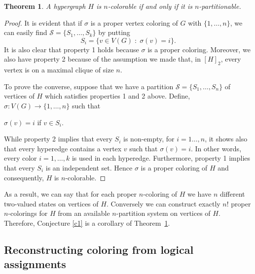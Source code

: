 \documentclass[%
12pt,
prereprint,
showpacs,
showkeys,
preprintnumbers,
amsmath,amssymb,
aps,
pra,
longbibliography,
notitlepage
]{revtex4-1}
\newtheorem{theorem}{{\color{THM} Theorem}}%
\theoremstyle{definition}
\begin{document}
        \begin{theorem}\label{separable}
                A hypergraph $H$ is $n$-colorable if and only if it is $n$-partitionable.
        \end{theorem}
        \begin{proof}
                It is evident that if $\sigma$ is a proper vertex coloring of $G$ with $\{1,\ldots , n\}$, we can easily find $\mathcal{S}=\{S_1 , \ldots , S_k \}$ by putting $$S_i =\{v\in V(G)\; : \; \sigma(v)=i \}.$$ It is also clear that property 1 holds because $\sigma$ is a proper coloring. Moreover, we also have property 2 because of the assumption we made that, in $[H]_2$, every vertex is on a maximal clique of size $n$.

                To prove the converse, suppose that we have a partition $\mathcal{S}=\{S_1 , \ldots , S_n \}$ of vertices of $H$ which satisfies properties 1 and 2 above. Define, $\sigma: V(G) \longrightarrow \{1,\ldots , n\}$ such that

                \begin{center}
                        $\sigma(v)=i$ if $v\in S_i.$
                \end{center}

                While property 2 implies that every $S_i$ is non-empty, for $i=1\ldots , n$, it shows also that every hyperedge contains a vertex $v$ such that $\sigma (v)=i$. In other words, every color $i=1,\ldots,k$ is used in each hyperedge. Furthermore, property 1 implies that every $S_i$ is an independent set. Hence $\sigma$ is a proper coloring of $H$ and consequently, $H$ is $n$-colorable.
        \end{proof}

        As a result, we can say that for each proper $n$-coloring of $H$ we have $n$ different two-valued states on vertices of $H$. Conversely we can construct exactly $n!$ proper $n$-colorings for $H$ from an available $n$-partition system on vertices of $H$. %
        Therefore, Conjecture \ref{c1} is a corollary of Theorem~\ref{separable}.


        \subsection{Reconstructing coloring from logical assignments}
\end{document}
